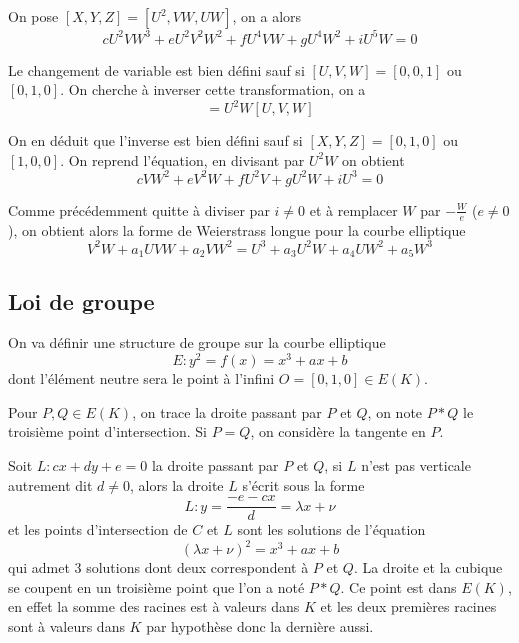 \documentclass{article}
\begin{document}
On pose $[X, Y, Z]=[U^2, VW, UW]$, on a alors
\begin{equation*}
cU^2VW^3 + eU^2V^2W^2 + fU^4VW + gU^4W^2 + iU^5W = 0
\end{equation*}

Le changement de variable est bien défini sauf si $[U, V, W]=[0, 0, 1]$ ou $[0, 1, 0]$.
On cherche à inverser cette transformation, on a
\begin{equation*}
[XZ, XY, Z^2]=U^2W[U, V, W]
\end{equation*}

On en déduit que l'inverse est bien défini sauf si $[X, Y, Z]=[0, 1, 0]$ ou $[1, 0, 0]$.
On reprend l'équation, en divisant par $U^2W$ on obtient
\begin{equation*}
cVW^2 + eV^2W + fU^2V + gU^2W + iU^3 = 0
\end{equation*}

Comme précédemment quitte à diviser par $i\neq 0$ et à remplacer $W$ par $-\frac{W}{e}$ ($e\neq 0$), on obtient
alors la forme de Weierstrass longue pour la courbe elliptique
\begin{equation*}
V^2W + a_{1}UVW + a_{2}VW^2 = U^3 + a_{3}U^2W + a_{4}UW^2 + a_{5}W^3
\end{equation*}

\subsection{Loi de groupe}
On va définir une structure de groupe sur la courbe elliptique
\begin{equation*}
E: y^{2} = f(x) = x^{3} + ax + b
\end{equation*}
dont
l'élément neutre sera le point à l'infini $O=[0,1,0]\in E(K)$.

Pour $P,Q\in E(K)$, on trace la droite passant par $P$ et $Q$, on note $P*Q$ le troisième point d'intersection.
Si $P=Q$, on considère la tangente en $P$.

Soit $L: cx+dy+e=0$ la droite passant par $P$ et $Q$, si $L$ n'est pas verticale autrement dit $d\neq 0$, alors
la droite $L$ s'écrit sous la forme
\begin{equation*}
L: y=\frac{-e-cx}{d}=\lambda x + \nu
\end{equation*}
et les points d'intersection de $C$ et $L$ sont les solutions de l'équation
\begin{equation*}
(\lambda x + \nu)^2 = x^3 + ax + b
\end{equation*}
qui admet 3 solutions dont deux correspondent à $P$ et $Q$. La droite et la cubique se coupent en un troisième
point que l'on a noté $P*Q$. Ce point est dans $E(K)$, en effet la somme des racines est à valeurs dans $K$ et les
deux premières racines sont à valeurs dans $K$ par hypothèse donc la dernière aussi.
\end{document}
